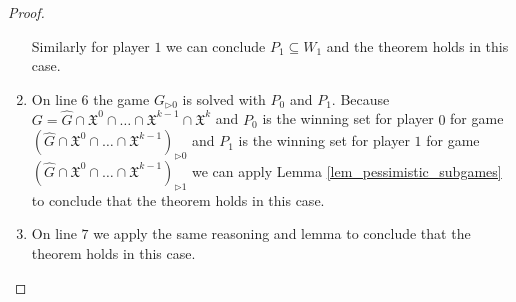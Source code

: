 \begin{theorem}
\begin{proof}
\begin{enumerate}
			Similarly for player $1$ we can conclude $P_1 \subseteq W_1$ and the theorem holds in this case.
			\item On line $6$ the game $G_{\triangleright0}$ is solved with $P_0$ and $P_1$. Because $G = \hat{G} \cap \mathfrak{X}^0 \cap \dots \cap \mathfrak{X}^{k-1} \cap \mathfrak{X}^k$ and $P_0$ is the winning set for player $0$ for game $(\hat{G} \cap \mathfrak{X}^0 \cap \dots \cap \mathfrak{X}^{k-1})_{\triangleright0}$ and $P_1$ is the winning set for player $1$ for game $(\hat{G} \cap \mathfrak{X}^0 \cap \dots \cap \mathfrak{X}^{k-1})_{\triangleright1}$ we can apply Lemma \ref{lem_pessimistic_subgames} to conclude that the theorem holds in this case.
			\item On line $7$ we apply the same reasoning and lemma to conclude that the theorem holds in this case.
		\end{enumerate}
	\end{proof}
\end{theorem}

